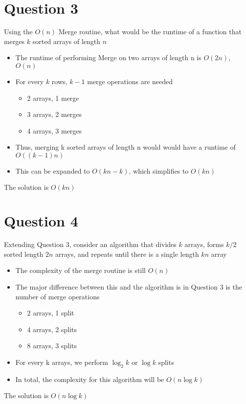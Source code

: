 \documentclass{report}
\begin{document}
    \section{Question 3}
    Using the $O(n)$ Merge routine, what would be the runtime of a function that merges $k$ sorted arrays of length $n$
        \begin{itemize}
            \item{The runtime of performing Merge on two arrays of length n is $O(2n)$, $O(n)$}
            \item{For every $k$ rows, $k - 1$ merge operations are needed}
                \begin{itemize}
                    \item{2 arrays, 1 merge}
                    \item{3 arrays, 2 merges}
                    \item{4 arrays, 3 merges}
                \end{itemize}
            \item{Thus, merging k sorted arrays of length n would would have a runtime of $O((k-1)n)$}
            \item{This can be expanded to $O(kn - k)$, which simplifies to $O(kn)$}
        \end{itemize}
        The solution is $O(kn)$

    \section{Question 4}
    Extending Question 3, consider an algorithm that divides $k$ arrays, forms $k/2$ sorted length $2n$ arrays,
    and repeats until there is a single length $kn$ array
        \begin{itemize}
            \item{The complexity of the merge routine is still $O(n)$}
            \item{The major difference between this and the algorithm is in Question 3 is the number of merge operations}
                \begin{itemize}
                  \item{2 arrays, 1 split}
                  \item{4 arrays, 2 splits}
                  \item{8 arrays, 3 splits}
                \end{itemize}
            \item{For every k arrays, we perform $\log_2 k$ or $\log k$ splits}
            \item{In total, the complexity for this algorithm will be $O(n\log k)$}
        \end{itemize}
        The solution is $O(n\log k)$
\end{document}
